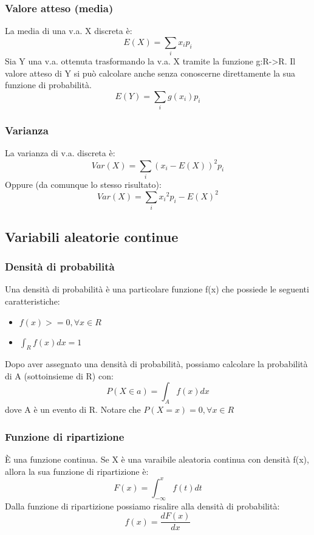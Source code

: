 \documentclass{article}
\begin{document}
\subsubsection{Valore atteso (media)}
La media di una v.a. X discreta è:
\begin{equation}
E(X) = \sum_{i}{x_{i}p_{i}}
\end{equation}
Sia Y una v.a. ottenuta trasformando la v.a. X tramite la funzione g:R->R. Il valore atteso di Y si può calcolare anche senza conoscerne direttamente la sua funzione di probabilità.
\begin{equation}
E(Y)=\sum_{i}g(x_i)p_i
\end{equation}
\subsubsection{Varianza}
La varianza di v.a. discreta è:
\begin{equation}
Var(X)=\sum_{i}{(x_{i}-E(X))^{2}p_i}
\end{equation}
Oppure (da comunque lo stesso risultato):
\begin{equation}
Var(X)=\sum_{i}{{{x_i}^{2}p_i}}-E(X)^2
\end{equation}
\subsection{Variabili aleatorie continue}
\subsubsection{Densità di probabilità}
Una densità di probabilità è una particolare funzione f(x) che possiede le seguenti caratteristiche:
\begin{itemize}
\item $f(x)>=0, \forall{x\in{R}}$
\item $\int_{R}{f(x)dx}=1$
\end{itemize}
Dopo aver assegnato una densità di probabilità, possiamo calcolare la probabilità di A (sottoinsieme di R) con:
\begin{equation}
P(X\in{a})=\int_{A}{f(x)dx}
\end{equation}
dove A è un evento di R. Notare che $P(X=x) = 0, \forall{x\in{R}}$
\subsubsection{Funzione di ripartizione}
È una funzione continua. Se X è una varaibile aleatoria continua con densità f(x), allora la sua funzione di ripartizione è:\\
\begin{equation}
F(x) = \int_{-\infty}^{x}f(t)dt
\end{equation}
Dalla funzione di ripartizione possiamo risalire alla densità di probabilità:
\begin{equation}
f(x) = \frac{dF(x)}{dx}
\end{equation}
\end{document}
